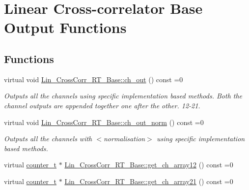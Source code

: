 \hypertarget{group__Lin__CorrCorr__Base__Out}{}\section{\textquotesingle{}\textquotesingle{}Linear Cross-\/correlator Base Output Functions\textquotesingle{}\textquotesingle{}}
\label{group__Lin__CorrCorr__Base__Out}
\subsection*{Functions}
\begin{DoxyCompactItemize}
\item 
virtual void \hyperlink{group__Lin__CorrCorr__Base__Out_ga5d7bad992e07606a18ea828aeb768e1f}{Lin\+\_\+\+Cross\+Corr\+\_\+\+R\+T\+\_\+\+Base\+::ch\+\_\+out} () const =0
\begin{DoxyCompactList}\small\item\em Outputs all the channels using specific implementation based methods. Both the channel outputs are appended together one after the other. 12-\/21. \end{DoxyCompactList}\item 
virtual void \hyperlink{group__Lin__CorrCorr__Base__Out_gaaac0e6901df27096d687c228638c012b}{Lin\+\_\+\+Cross\+Corr\+\_\+\+R\+T\+\_\+\+Base\+::ch\+\_\+out\+\_\+norm} () const =0
\begin{DoxyCompactList}\small\item\em Outputs all the channels with {\bfseries } $<$normalisation$>$ using specific implementation based methods. \end{DoxyCompactList}\item 
virtual \hyperlink{types_8hpp_a22f279793847eba127de149437848c48}{counter\+\_\+t} $\ast$ \hyperlink{group__Lin__CorrCorr__Base__Out_gacc777900e8d232740373a70c1d5b4cce}{Lin\+\_\+\+Cross\+Corr\+\_\+\+R\+T\+\_\+\+Base\+::get\+\_\+ch\+\_\+array12} () const =0
\item 
virtual \hyperlink{types_8hpp_a22f279793847eba127de149437848c48}{counter\+\_\+t} $\ast$ \hyperlink{group__Lin__CorrCorr__Base__Out_ga9f075c765376a156da279b23bc18c07f}{Lin\+\_\+\+Cross\+Corr\+\_\+\+R\+T\+\_\+\+Base\+::get\+\_\+ch\+\_\+array21} () const =0
\end{DoxyCompactItemize}


